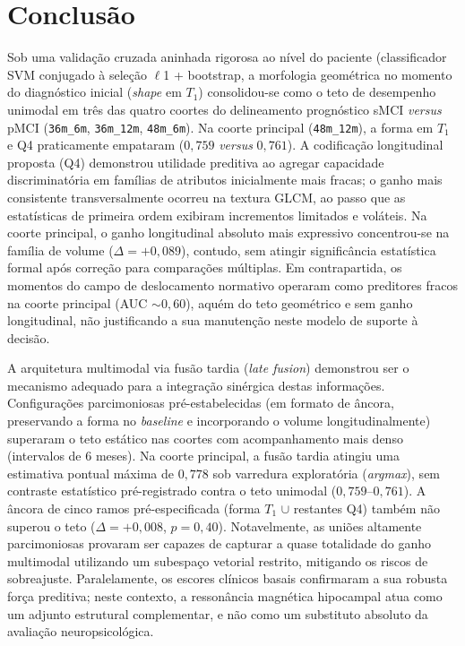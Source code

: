 \documentclass[review]{elsarticle}
\newcommand{\code}[1]{\texttt{#1}}
\begin{document}
	\section{Conclusão}\label{sec:Conclusions}
	
	Sob uma validação cruzada aninhada rigorosa ao nível do paciente (classificador SVM conjugado à seleção $\ell$1 + bootstrap, a morfologia geométrica no momento do diagnóstico inicial (\emph{shape} em $T_1$) consolidou-se como o teto de desempenho unimodal em três das quatro coortes do delineamento prognóstico sMCI \emph{versus} pMCI (\code{36m\_6m}, \code{36m\_12m}, \code{48m\_6m}). Na coorte principal (\code{48m\_12m}), a forma em $T_1$ e Q4 praticamente empataram ($0{,}759$ \emph{versus} $0{,}761$). A codificação longitudinal proposta (Q4) demonstrou utilidade preditiva ao agregar capacidade discriminatória em famílias de atributos inicialmente mais fracas; o ganho mais consistente transversalmente ocorreu na textura GLCM, ao passo que as estatísticas de primeira ordem exibiram incrementos limitados e voláteis. Na coorte principal, o ganho longitudinal absoluto mais expressivo concentrou-se na família de volume ($\Delta = +0{,}089$), contudo, sem atingir significância estatística formal após correção para comparações múltiplas. Em contrapartida, os momentos do campo de deslocamento normativo operaram como preditores fracos na coorte principal (AUC $\sim 0{,}60$), aquém do teto geométrico e sem ganho longitudinal, não justificando a sua manutenção neste modelo de suporte à decisão.
	
	A arquitetura multimodal via fusão tardia (\emph{late fusion}) demonstrou ser o mecanismo adequado para a integração sinérgica destas informações. Configurações parcimoniosas pré-estabelecidas (em formato de âncora, preservando a forma no \textit{baseline} e incorporando o volume longitudinalmente) superaram o teto estático nas coortes com acompanhamento mais denso (intervalos de 6 meses). Na coorte principal, a fusão tardia atingiu uma estimativa pontual máxima de $0{,}778$ sob varredura exploratória (\emph{argmax}), sem contraste estatístico pré-registrado contra o teto unimodal ($0{,}759$--$0{,}761$). A âncora de cinco ramos pré-especificada (forma $T_1$ $\cup$ restantes Q4) também não superou o teto ($\Delta=+0{,}008$, $p=0{,}40$). Notavelmente, as uniões altamente parcimoniosas provaram ser capazes de capturar a quase totalidade do ganho multimodal utilizando um subespaço vetorial restrito, mitigando os riscos de sobreajuste. Paralelamente, os escores clínicos basais confirmaram a sua robusta força preditiva; neste contexto, a ressonância magnética hipocampal atua como um adjunto estrutural complementar, e não como um substituto absoluto da avaliação neuropsicológica.
	
\end{document}

